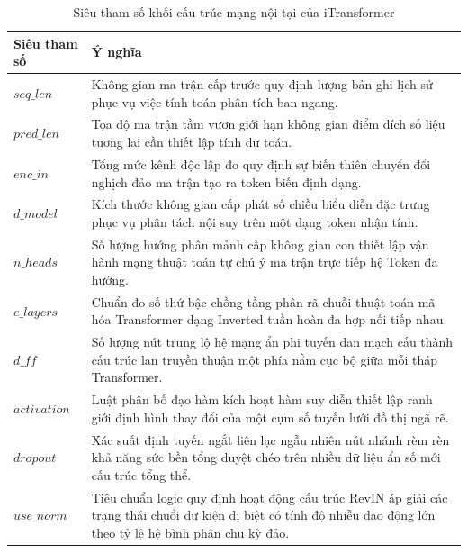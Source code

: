 \begin{table}[htbp]
\centering
\caption{Siêu tham số khối cấu trúc mạng nội tại của iTransformer}
\label{tab:itrans_structure}
\renewcommand{\arraystretch}{1.3}
\begin{tabular}{p{3.8cm} p{10.5cm}}
\toprule
\textbf{Siêu tham số} & \textbf{Ý nghĩa} \\
\midrule
$seq\_len$ & Không gian ma trận cấp trước quy định lượng bản ghi lịch sử phục vụ việc tính toán phân tích ban ngang. \\
$pred\_len$ & Tọa độ ma trận tầm vươn giới hạn không gian điểm đích số liệu tương lai cần thiết lập tính dự toán. \\
$enc\_in$ & Tổng mức kênh độc lập đo quy định sự biến thiên chuyển đổi nghịch đảo ma trận tạo ra token biến định dạng. \\
$d\_model$ & Kích thước không gian cấp phát số chiều biểu diễn đặc trưng phục vụ phân tách nội suy trên một dạng token nhận tính. \\
$n\_heads$ & Số lượng hướng phân mảnh cấp không gian con thiết lập vận hành mạng thuật toán tự chú ý ma trận trực tiếp hệ Token đa hướng. \\
$e\_layers$ & Chuẩn đo số thứ bậc chồng tầng phân rã chuỗi thuật toán mã hóa Transformer dạng Inverted tuần hoàn đa hợp nối tiếp nhau. \\
$d\_ff$ & Số lượng nút trung lộ hệ mạng ẩn phi tuyến đan mạch cấu thành cấu trúc lan truyền thuận một phía nằm cục bộ giữa mỗi tháp Transformer. \\
$activation$ & Luật phân bố đạo hàm kích hoạt hàm suy diễn thiết lập ranh giới định hình thay đổi của một cụm số tuyến lưới đồ thị ngã rẽ. \\
$dropout$ & Xác suất định tuyến ngắt liên lạc ngẫu nhiên nút nhánh rèm rèn khả năng sức bền tổng duyệt chéo trên nhiều dữ liệu ẩn số mới cấu trúc tổng thể. \\
$use\_norm$ & Tiêu chuẩn logic quy định hoạt động cấu trúc RevIN áp giải các trạng thái chuổi dữ kiện dị biệt có tính độ nhiễu dao động lớn theo tỷ lệ hệ bình phân chu kỳ đảo. \\
\bottomrule
\end{tabular}
\end{table}

